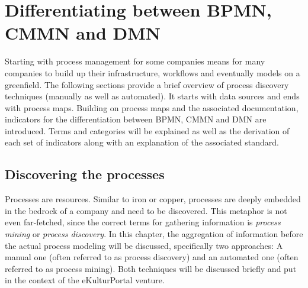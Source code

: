 \chapter{Differentiating between BPMN, CMMN and DMN}
\label{chapter:indicators}

Starting with process management for some companies means for many companies to build up their infrastructure, workflows and eventually models on a greenfield. The following sections provide a brief overview of process discovery techniques (manually as well as automated). It starts with data sources and ends with process maps. Building on process maps and the associated documentation, indicators for the differentiation between BPMN, CMMN and DMN are introduced. Terms and categories will be explained as well as the derivation of each set of indicators along with an explanation of the associated standard. 

\section{Discovering the processes}
\label{section:process_discovery}
Processes are resources. Similar to iron or copper, processes are deeply embedded in the bedrock of a company and need to be discovered. This metaphor is not even far-fetched, since the correct terms for gathering information is \textit{process mining} or \textit{process discovery}.
In this chapter, the aggregation of information before the actual process modeling will be discussed, specifically two approaches: A manual one (often referred to as process discovery) and an automated one (often referred to as process mining). Both techniques will be discussed briefly and put in the context of the eKulturPortal venture. 

